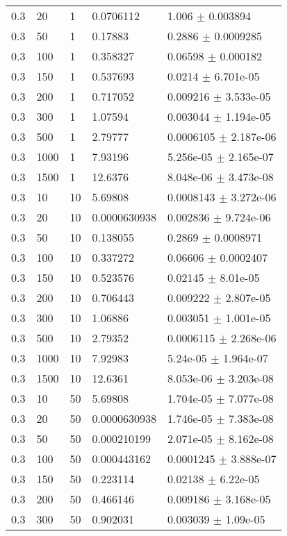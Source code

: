 \begin{longtable}{lllll}
 0.3 &    20 &     1 & 0.0706112 &    1.006 $\pm$ 0.003894 \\
 0.3 &    50 &     1 &  0.17883 &   0.2886 $\pm$ 0.0009285 \\
 0.3 &   100 &     1 & 0.358327 &  0.06598 $\pm$ 0.000182 \\
 0.3 &   150 &     1 & 0.537693 &   0.0214 $\pm$ 6.701e-05 \\
 0.3 &   200 &     1 & 0.717052 & 0.009216 $\pm$ 3.533e-05 \\
 0.3 &   300 &     1 &  1.07594 & 0.003044 $\pm$ 1.194e-05 \\
 0.3 &   500 &     1 &  2.79777 & 0.0006105 $\pm$ 2.187e-06 \\
 0.3 &  1000 &     1 &  7.93196 & 5.256e-05 $\pm$ 2.165e-07 \\
 0.3 &  1500 &     1 &  12.6376 & 8.048e-06 $\pm$ 3.473e-08 \\
 0.3 &    10 &    10 &  5.69808 & 0.0008143 $\pm$ 3.272e-06 \\
 0.3 &    20 &    10 & 0.0000630938 & 0.002836 $\pm$ 9.724e-06 \\
 0.3 &    50 &    10 & 0.138055 &   0.2869 $\pm$ 0.0008971 \\
 0.3 &   100 &    10 & 0.337272 &  0.06606 $\pm$ 0.0002407 \\
 0.3 &   150 &    10 & 0.523576 &  0.02145 $\pm$ 8.01e-05 \\
 0.3 &   200 &    10 & 0.706443 & 0.009222 $\pm$ 2.807e-05 \\
 0.3 &   300 &    10 &  1.06886 & 0.003051 $\pm$ 1.001e-05 \\
 0.3 &   500 &    10 &  2.79352 & 0.0006115 $\pm$ 2.268e-06 \\
 0.3 &  1000 &    10 &  7.92983 & 5.24e-05 $\pm$ 1.964e-07 \\
 0.3 &  1500 &    10 &  12.6361 & 8.053e-06 $\pm$ 3.203e-08 \\
 0.3 &    10 &    50 &  5.69808 & 1.704e-05 $\pm$ 7.077e-08 \\
 0.3 &    20 &    50 & 0.0000630938 & 1.746e-05 $\pm$ 7.383e-08 \\
 0.3 &    50 &    50 & 0.000210199 & 2.071e-05 $\pm$ 8.162e-08 \\
 0.3 &   100 &    50 & 0.000443162 & 0.0001245 $\pm$ 3.888e-07 \\
 0.3 &   150 &    50 & 0.223114 &  0.02138 $\pm$ 6.22e-05 \\
 0.3 &   200 &    50 & 0.466146 & 0.009186 $\pm$ 3.168e-05 \\
 0.3 &   300 &    50 & 0.902031 & 0.003039 $\pm$ 1.09e-05 \\

\end{longtable}
